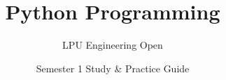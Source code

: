\documentclass[a4paper,11pt,oneside,openany]{book}
\title{Python Programming}
\author{LPU Engineering Open}
\date{Semester 1 Study \& Practice Guide}
\begin{document}
\frontmatter

\makebookcover
\copyrightpage
\disclaimerpage

\tableofcontents
\newpage

\mainmatter


















\end{document}
